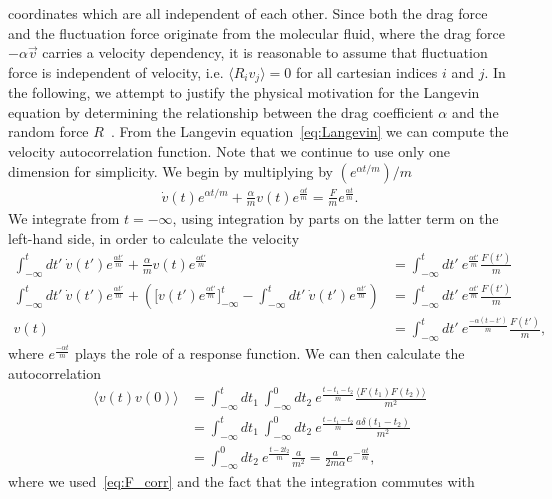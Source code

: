coordinates which are all independent of each other. Since both the drag
force and the fluctuation force originate from the molecular fluid, where the
drag force $-\alpha \vec{v}$ carries a velocity dependency, it is reasonable to assume that fluctuation force is independent of velocity, i.e. $\langle R_i v_j \rangle = 0$ for all cartesian indices $i$ and $j$. In the following, we attempt to justify the physical motivation for the Langevin equation by determining the relationship between the drag coefficient $\alpha$ and the random force $R$~\cite{stat_phys}. From the Langevin equation~\cref{eq:Langevin} we can compute the velocity autocorrelation function. Note that we continue to use only one dimension for simplicity. We begin by multiplying by $(e^{\alpha t /m})/m$
\begin{align*}
  \dot{ v}(t)e^{\alpha t /m} + \frac{\alpha}{m} v(t)e^{\frac{\alpha t}{m}}  = \frac{ F}{m}e^{\frac{\alpha t}{m}}.
\end{align*}
We integrate from $t = -\infty$, using integration by parts on the
latter term on the left-hand side, in order to calculate the velocity 
\begin{align*}
  \int_{-\infty}^t dt' \ \dot{ v}(t')e^{\frac{\alpha t'}{m}} + \frac{\alpha}{m} v(t)e^{\frac{\alpha t'}{m}} &=  \int_{-\infty}^t dt' \ e^{\frac{\alpha t'}{m}} \frac{ F(t')}{m}  \\
  \int_{-\infty}^t dt' \ \dot{ v}(t')e^{\frac{\alpha t'}{m}} + \left(\Big[ v(t')e^{\frac{\alpha t'}{m}}\Big]_{-\infty}^t - \int_{-\infty}^t dt' \ \dot{ v}(t')e^{\frac{\alpha t'}{m}}\right) &= \int_{-\infty}^t dt' \ e^{\frac{\alpha t'}{m}} \frac{ F(t')}{m}  \\
   v(t) &= \int_{-\infty}^t dt' \ e^{\frac{-\alpha(t - t')}{m}} \frac{ F(t')}{m},
\end{align*}
where $e^{\frac{-\alpha t}{m}}$ plays the role of a response function. We can
then calculate the autocorrelation 
\begin{align*}
  \big\langle  v(t) v(0) \big\rangle &= \int_{-\infty}^t dt_1 \ \int_{-\infty}^0 dt_2 \ e^{\frac{t - t_1 - t_2}{m}} \frac{\langle  F(t_1)  F(t_2) \rangle}{m^2} \\
  &= \int_{-\infty}^t dt_1 \ \int_{-\infty}^0 dt_2 \ e^{\frac{t - t_1 - t_2}{m}} \frac{a \delta(t_1 - t_2)}{m^2} \\
  &= \int_{-\infty}^0 dt_2 \ e^{\frac{t - 2t_2}{m}} \frac{a}{m^2} = \frac{a}{2m\alpha}e^{-\frac{\alpha t}{m}},
\end{align*}
where we used~\cref{eq:F_corr} and the fact that the integration commutes with
